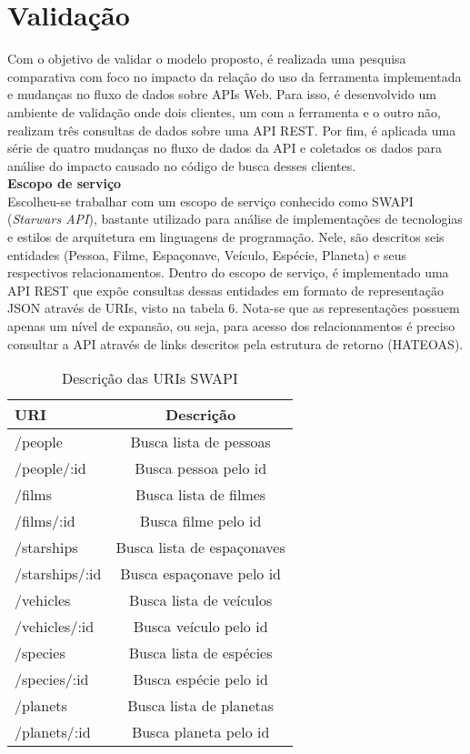 \chapter{Validação}

Com o objetivo de validar o modelo proposto, é realizada uma pesquisa comparativa com foco no impacto da relação do uso da ferramenta implementada e mudanças no fluxo de dados sobre APIs Web. Para isso, é desenvolvido um ambiente de validação onde dois clientes, um com a ferramenta e o outro não, realizam três consultas de dados sobre uma API REST. Por fim, é aplicada uma série de quatro mudanças no fluxo de dados da API e coletados os dados para análise do impacto causado no código de busca desses clientes. \\

\textbf{Escopo de serviço} \\

Escolheu-se trabalhar com um escopo de serviço conhecido como SWAPI (\textit{Starwars API}), bastante utilizado para análise de implementações de tecnologias e estilos de arquitetura em linguagens de programação. Nele, são descritos seis entidades (Pessoa, Filme, Espaçonave, Veículo, Espécie, Planeta) e seus respectivos relacionamentos. Dentro do escopo de serviço, é implementado uma API REST que expõe consultas dessas entidades em formato de representação JSON através de URIs, visto na tabela 6. Nota-se que as representações possuem apenas um nível de expansão, ou seja, para acesso dos relacionamentos é preciso consultar a API através de links descritos pela estrutura de retorno (HATEOAS).

\begin{table}[H]
  \centering
  \begin{tabular}{|l|c|}
    \hline
    URI & Descrição \\
    \hline
    /people & Busca lista de pessoas \\
    \hline
    /people/:id & Busca pessoa pelo id \\
    \hline
    /films & Busca lista de filmes \\
    \hline
    /films/:id & Busca filme pelo id \\
    \hline
    /starships & Busca lista de espaçonaves \\
    \hline
    /starships/:id & Busca espaçonave pelo id \\
    \hline
    /vehicles & Busca lista de veículos \\
    \hline
    /vehicles/:id & Busca veículo pelo id \\
    \hline
    /species & Busca lista de espécies \\
    \hline
    /species/:id & Busca espécie pelo id \\
    \hline
    /planets & Busca lista de planetas \\
    \hline
    /planets/:id & Busca planeta pelo id \\
    \hline
  \end{tabular}
  \caption{Descrição das URIs SWAPI}
\end{table}

